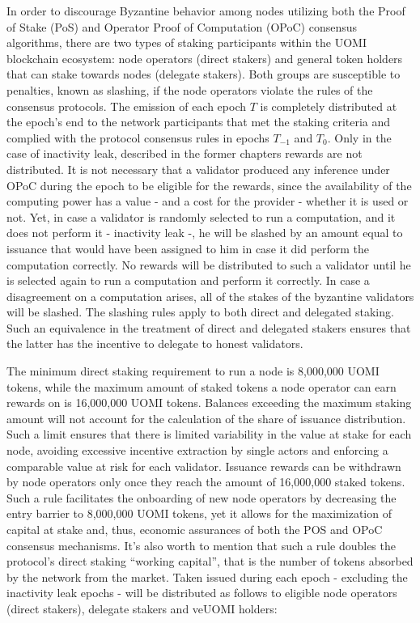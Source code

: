 \documentclass{article}
\begin{document}
In order to discourage Byzantine behavior among nodes utilizing both the Proof of Stake (PoS) and Operator Proof of Computation (OPoC) consensus algorithms, there are two types of staking participants within the UOMI blockchain ecosystem: node operators (direct stakers) and general token holders that can stake towards nodes (delegate stakers). Both groups are susceptible to penalties, known as slashing, if the node operators violate the rules of the consensus protocols. 
The emission of each epoch \(T\) is completely distributed at the epoch's end to the network participants that met the staking criteria and complied with the protocol consensus rules in epochs \( T_{-1} \) and \(T_0\). Only in the case of inactivity leak, described in the former chapters rewards are not distributed. It is not necessary that a validator produced any inference under OPoC during the epoch to be eligible for the rewards, since the availability of the computing power has a value - and a cost for the provider - whether it is used or not. 
Yet, in case a validator is randomly selected to run a computation, and it does not perform it - inactivity leak -, he will be slashed by an amount equal to issuance that would have been assigned to him in case it did perform the computation correctly. No rewards will be distributed to such a validator until he is selected again to run a computation and perform it correctly. In case a disagreement on a computation arises, all of the stakes of the byzantine validators will be slashed. The slashing rules apply to both direct and delegated staking. Such an equivalence in the treatment of direct and delegated stakers ensures that the latter has the incentive to delegate to honest validators.


The minimum direct staking requirement to run a node is 8,000,000 UOMI tokens, while the maximum amount of staked tokens a node operator can earn rewards on is 16,000,000 UOMI tokens. Balances exceeding the maximum staking amount will not account for the calculation of the share of issuance distribution. Such a limit ensures that there is limited variability in the value at stake for each node, avoiding excessive incentive extraction by single actors and enforcing a comparable value at risk for each validator.
Issuance rewards can be withdrawn by node operators only once they reach the amount of 16,000,000 staked tokens. Such a rule facilitates the onboarding of new node operators by decreasing the entry barrier to 8,000,000 UOMI tokens, yet it allows for the maximization of capital at stake and, thus, economic assurances of both the POS and OPoC consensus mechanisms. It’s also worth to mention that such a rule doubles the protocol’s direct staking “working capital”, that is the number of tokens absorbed by the network from the market.
Taken issued during each epoch - excluding the inactivity leak epochs - will be distributed as follows to eligible node operators (direct stakers), delegate stakers and veUOMI holders:
\end{document}
